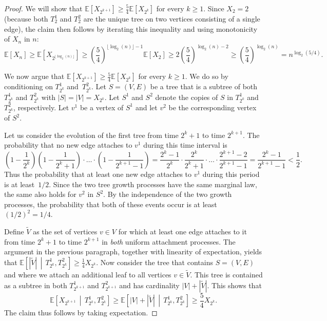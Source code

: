 \documentclass[11pt]{article}
\numberwithin{equation}{section}
\newcommand{\E}{\mathbb{E}} %
\newcommand{\wt}{\widetilde} %
\theoremstyle{definition}
\begin{document}
\begin{proof}
We will show that 
$\E \left[ X_{2^{k+1}} \right] 
\geq \frac{5}{4} \E \left[ X_{2^{k}} \right]$ 
for every $k \geq 1$. 
Since $X_{2} = 2$ 
(because both $T_{2}^{1}$ and $T_{2}^{2}$ are the unique tree on two vertices consisting of a single edge), the claim then follows by iterating this inequality and using monotonicity of $X_{n}$ in $n$: 
\begin{equation}\label{eq:recursion_simple}
\E \left[ X_{n} \right] 
\geq \E \left[ X_{2^{\lfloor \log_{2}(n) \rfloor}} \right] 
\geq \left( \frac{5}{4} \right)^{\lfloor \log_{2}(n) \rfloor - 1} \E \left[ X_{2} \right] 
\geq 2 \left( \frac{5}{4} \right)^{\log_{2}(n) - 2}
\geq \left( \frac{5}{4} \right)^{\log_{2}(n)} 
= n^{\log_{2}(5/4)}. 
\end{equation}

We now argue that 
$\E \left[ X_{2^{k+1}} \right] 
\geq \frac{5}{4} \E \left[ X_{2^{k}} \right]$ 
for every $k \geq 1$. 
We do so by conditioning on $T_{2^{k}}^{1}$ and~$T_{2^{k}}^{2}$. 
Let $S=(V,E)$ be a tree that is a subtree of both $T_{2^{k}}^{1}$ and $T_{2^{k}}^{2}$ with $|S|=|V|=X_{2^k}$.
Let $S^{1}$ and $S^{2}$ denote the copies of $S$ in 
$T_{2^{k}}^{1}$ and $T_{2^{k}}^{2}$, respectively. 
Let $v^{1}$ be a vertex of $S^{1}$ and let $v^{2}$ be the corresponding vertex of $S^{2}$. 

Let us consider the evolution of the first tree from time $2^{k}+1$ to time $2^{k+1}$. 
The probability that no new edge attaches to $v^{1}$ during this time interval is 
\[
\left(1-\frac{1}{2^k}\right) \left(1-\frac{1}{2^k+1}\right) \cdot \ldots \cdot  \left(1-\frac{1}{2^{k+1}-1}\right) 
= \frac{2^k-1}{2^k} \cdot \frac{2^k}{2^k+1} \cdot \ldots \cdot  \frac{2^{k+1}-2}{2^{k+1}-1} 
= \frac{2^k - 1}{2^{k+1}-1}
< \frac{1}{2}.
\]
Thus the probability that at least one new edge attaches to $v^{1}$ during this period is at least~$1/2$. 
Since the two tree growth processes have the same marginal law, the same also holds for $v^{2}$ in $S^{2}$. 
By the independence of the two growth processes, 
the probability that 
both of these events occur 
is at least $(1/2)^{2} = 1/4$. 

Define $\wt{V}$ as the set of vertices $v \in V$ for which at least one edge attaches to it from time $2^{k}+1$ to time $2^{k+1}$ in \emph{both} uniform attachment processes. 
The argument in the previous paragraph, together with linearity of expectation, yields that 
$\E \left[ |\wt{V}| \, \middle| \, T_{2^{k}}^{1}, T_{2^{k}}^{2} \right] 
\geq \frac{1}{4} X_{2^{k}}$. 
Now consider the tree that contains $S=(V,E)$ and where we attach an additional leaf to all vertices $v \in \wt{V}$. 
This tree is contained as a subtree in both $T_{2^{k+1}}^{1}$ and $T_{2^{k+1}}^{2}$ 
and has cardinality $|V|+|\wt{V}|$. 
This shows that 
\[
\E \left[ X_{2^{k+1}} \, \middle| \, T_{2^{k}}^{1}, T_{2^{k}}^{2} \right] 
\geq \E \left[ |V| + |\wt{V}| \, \middle| \, T_{2^{k}}^{1}, T_{2^{k}}^{2} \right] 
\geq \frac{5}{4} X_{2^{k}}.
\]
The claim thus follows by taking expectation. 
\end{proof}
\end{document}
